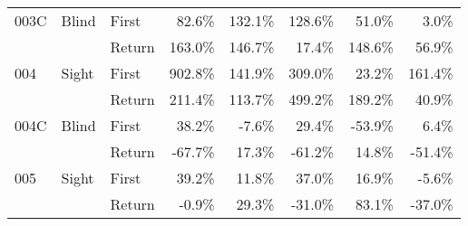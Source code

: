 \begin{table}[!htb]
\begin{tabular}{lllrrrrr}
003C & Blind & First &   82.6\% &  132.1\% &                                               128.6\% &                                                 51.0\% &    3.0\% \\
    &       & Return &  163.0\% &  146.7\% &                                                17.4\% &                                                148.6\% &   56.9\% \\
004 & Sight & First &  902.8\% &  141.9\% &                                               309.0\% &                                                 23.2\% &  161.4\% \\
    &       & Return &  211.4\% &  113.7\% &                                               499.2\% &                                                189.2\% &   40.9\% \\
004C & Blind & First &   38.2\% &   -7.6\% &                                                29.4\% &                                                -53.9\% &    6.4\% \\
    &       & Return &  -67.7\% &   17.3\% &                                               -61.2\% &                                                 14.8\% &  -51.4\% \\
005 & Sight & First &   39.2\% &   11.8\% &                                                37.0\% &                                                 16.9\% &   -5.6\% \\
    &       & Return &   -0.9\% &   29.3\% &                                               -31.0\% &                                                 83.1\% &  -37.0\% \\
\bottomrule
\end{tabular}
\end{table}

